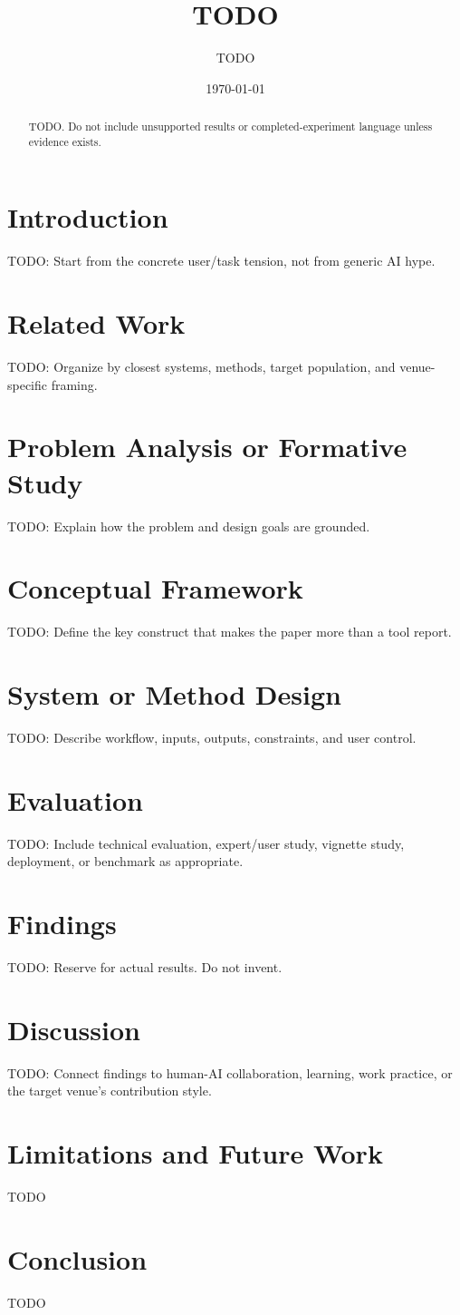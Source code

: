 \documentclass[11pt]{article}
\title{TODO}
\author{TODO}
\date{\today}
\begin{document}
\maketitle

\begin{abstract}
TODO. Do not include unsupported results or completed-experiment language unless evidence exists.
\end{abstract}

\section{Introduction}
TODO: Start from the concrete user/task tension, not from generic AI hype.

\section{Related Work}
TODO: Organize by closest systems, methods, target population, and venue-specific framing.

\section{Problem Analysis or Formative Study}
TODO: Explain how the problem and design goals are grounded.

\section{Conceptual Framework}
TODO: Define the key construct that makes the paper more than a tool report.

\section{System or Method Design}
TODO: Describe workflow, inputs, outputs, constraints, and user control.

\section{Evaluation}
TODO: Include technical evaluation, expert/user study, vignette study, deployment, or benchmark as appropriate.

\section{Findings}
TODO: Reserve for actual results. Do not invent.

\section{Discussion}
TODO: Connect findings to human-AI collaboration, learning, work practice, or the target venue's contribution style.

\section{Limitations and Future Work}
TODO

\section{Conclusion}
TODO
\end{document}
